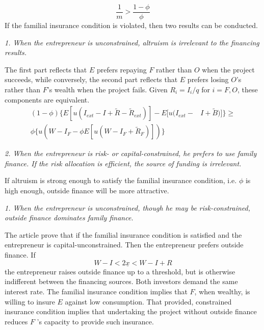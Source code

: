 \documentclass{article}
\begin{document}
    \begin{equation}
        \frac{1}{m}>\frac{1-\phi}{\phi}
    \end{equation}
    If the familial insurance condition is violated, then two results can be conducted. 
    
    \emph{1. When the entrepreneur is unconstrained, altruism is irrelevant to the financing results.} 
    
    The first part reflects that $E$ prefers repaying $F$ rather than $O$ when the project succeeds, 
    while conversely, the second part reflects that $E$ prefers losing $O$’s rather than $F$’s wealth when the project fails. 
    Given $R_i = I_i/q$ for $i = F,O$, these components are equivalent. 
    \begin{equation}
        \begin{aligned}
            (1-\phi)\big\{E[u(I_{ext}-I+\tilde{R}-\tilde{R}_{ext})]-
            E[u(I_{ext}-&I+\tilde{B})]\big\}\ge \\
            \phi\big\{u(W-I_F-\phi E[u(W-I_F+\tilde{R}_F)])\big\} 
        \end{aligned}
    \end{equation}

    \emph{2. When the entrepreneur is risk- or capital-constrained, he prefers to use family finance. If the risk allocation is efficient, the source of funding is irrelevant.}


    If altruism is strong enough to satisfy the familial insurance condition, i.e. $\phi$ is high enough, outside finance will be more attractive. 

    \emph{1. When the entrepreneur is unconstrained, though he may be risk-constrained, outside finance dominates family finance. }
    
    The article prove that if the familial insurance condition is satisfied and the entrepreneur is capital-unconstrained. Then the entrepreneur prefers outside finance.
    If 
    \begin{equation}
        W-I<2\underline{x}<W-I+R
    \end{equation}
    the entrepreneur raises outside finance up to a threshold, but is otherwise indifferent between
    the financing sources. Both investors demand the same interest rate. The familial insurance condition 
    implies that $F$, when wealthy, is willing to insure $E$ against low consumption. That provided, constrained insurance condition implies that undertaking the project without outside finance 
    reduces $F$ ’s capacity to provide such insurance.
\end{document}
